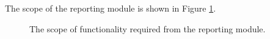 The scope of the reporting module is shown in Figure \ref{fig:reporting_scope}. 

\begin{figure}[htb]
\begin{center}
\end{center}
\caption{The scope of functionality required from the reporting module. \label{fig:reporting_scope}}
\end{figure}


